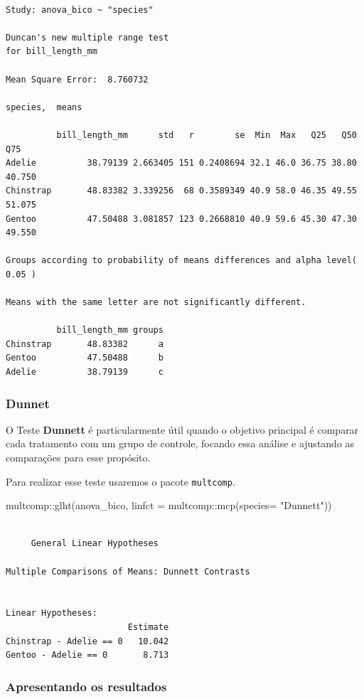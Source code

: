 \documentclass[
  letterpaper,
  DIV=11,
  numbers=noendperiod,
  oneside]{scrartcl}
\newenvironment{Shaded}{\begin{snugshade}}{\end{snugshade}}
\newcommand{\AttributeTok}[1]{\textcolor[rgb]{0.40,0.45,0.13}{#1}}
\newcommand{\FunctionTok}[1]{\textcolor[rgb]{0.28,0.35,0.67}{#1}}
\newcommand{\NormalTok}[1]{\textcolor[rgb]{0.00,0.23,0.31}{#1}}
\newcommand{\SpecialCharTok}[1]{\textcolor[rgb]{0.37,0.37,0.37}{#1}}
\newcommand{\StringTok}[1]{\textcolor[rgb]{0.13,0.47,0.30}{#1}}
\begin{document}
\begin{verbatim}

Study: anova_bico ~ "species"

Duncan's new multiple range test
for bill_length_mm 

Mean Square Error:  8.760732 

species,  means

          bill_length_mm      std   r        se  Min  Max   Q25   Q50    Q75
Adelie          38.79139 2.663405 151 0.2408694 32.1 46.0 36.75 38.80 40.750
Chinstrap       48.83382 3.339256  68 0.3589349 40.9 58.0 46.35 49.55 51.075
Gentoo          47.50488 3.081857 123 0.2668810 40.9 59.6 45.30 47.30 49.550

Groups according to probability of means differences and alpha level( 0.05 )

Means with the same letter are not significantly different.

          bill_length_mm groups
Chinstrap       48.83382      a
Gentoo          47.50488      b
Adelie          38.79139      c
\end{verbatim}

\subsubsection{Dunnet}\label{dunnet}

O Teste \textbf{Dunnett} é particularmente útil quando o objetivo
principal é comparar cada tratamento com um grupo de controle, focando
essa análise e ajustando as comparações para esse propósito.

Para realizar esse teste usaremos o pacote \texttt{multcomp}.

\begin{Shaded}
\begin{Highlighting}[]
\NormalTok{multcomp}\SpecialCharTok{::}\FunctionTok{glht}\NormalTok{(anova\_bico, }\AttributeTok{linfct =}\NormalTok{ multcomp}\SpecialCharTok{::}\FunctionTok{mcp}\NormalTok{(}\AttributeTok{species=} \StringTok{"Dunnett"}\NormalTok{))}
\end{Highlighting}
\end{Shaded}

\begin{verbatim}

     General Linear Hypotheses

Multiple Comparisons of Means: Dunnett Contrasts


Linear Hypotheses:
                        Estimate
Chinstrap - Adelie == 0   10.042
Gentoo - Adelie == 0       8.713
\end{verbatim}

\subsubsection{Apresentando os
resultados}\label{apresentando-os-resultados}
\end{document}
